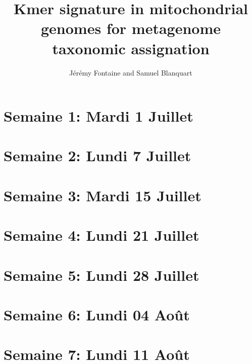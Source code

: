 \documentclass[10pt,a4paper]{article}
\title{Kmer signature in mitochondrial genomes for metagenome taxonomic assignation}
\author{Jérémy Fontaine and Samuel Blanquart}
\begin{document}
\maketitle

\section{Semaine 1: Mardi 1 Juillet}


\newpage
\section{Semaine 2: Lundi 7 Juillet}


\newpage
\section{Semaine 3: Mardi 15 Juillet}


\newpage
\section{Semaine 4: Lundi 21 Juillet}


\newpage
\section{Semaine 5: Lundi 28 Juillet}


\newpage
\section{Semaine 6: Lundi 04 Août}



\section{Semaine 7: Lundi 11 Août}



\end{document}
